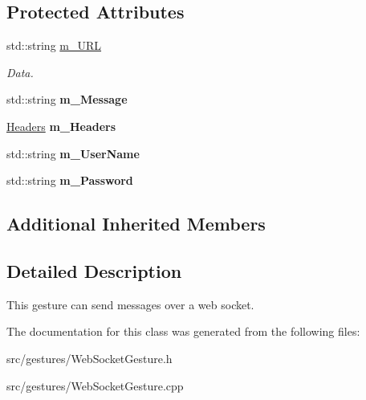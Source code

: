 \subsection*{Protected Attributes}
\begin{DoxyCompactItemize}
\item 
\mbox{\label{class_web_socket_gesture_aff99611e94cb8fde6967b4decd840ef2}} 
std\+::string \hyperlink{class_web_socket_gesture_aff99611e94cb8fde6967b4decd840ef2}{m\+\_\+\+U\+RL}
\begin{DoxyCompactList}\small\item\em Data. \end{DoxyCompactList}\item 
\mbox{\label{class_web_socket_gesture_a2775b41dc305ede82e5a672307aecdf3}} 
std\+::string {\bfseries m\+\_\+\+Message}
\item 
\mbox{\label{class_web_socket_gesture_a4243be951130256e29d5d4765f8cb193}} 
\hyperlink{class_web_socket_gesture_a0cc08ce65d72a224166d68550a7979ed}{Headers} {\bfseries m\+\_\+\+Headers}
\item 
\mbox{\label{class_web_socket_gesture_ae7ced1e40a38dad835031297d6be88b8}} 
std\+::string {\bfseries m\+\_\+\+User\+Name}
\item 
\mbox{\label{class_web_socket_gesture_a39e543db8b337fa75d37b918123e81f8}} 
std\+::string {\bfseries m\+\_\+\+Password}
\end{DoxyCompactItemize}
\subsection*{Additional Inherited Members}


\subsection{Detailed Description}
This gesture can send messages over a web socket. 

The documentation for this class was generated from the following files\+:\begin{DoxyCompactItemize}
\item 
src/gestures/Web\+Socket\+Gesture.\+h\item 
src/gestures/Web\+Socket\+Gesture.\+cpp\end{DoxyCompactItemize}
